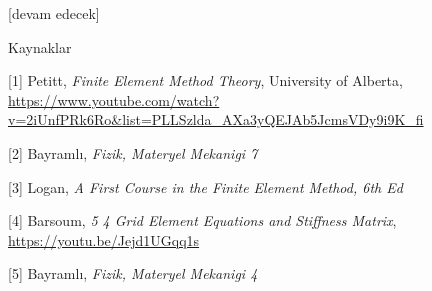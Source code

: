 \documentclass[12pt,fleqn]{article}\usepackage{../../common}
\begin{document}
[devam edecek]

Kaynaklar

[1] Petitt, {\em Finite Element Method Theory}, University of Alberta,
    \url{https://www.youtube.com/watch?v=2iUnfPRk6Ro&list=PLLSzlda_AXa3yQEJAb5JcmsVDy9i9K_fi}

[2] Bayramlı, {\em Fizik, Materyel Mekanigi 7}

[3] Logan, {\em A First Course in the Finite Element Method, 6th Ed}

[4] Barsoum, {\em 5 4 Grid Element Equations and Stiffness Matrix},
    \url{https://youtu.be/Jejd1UGqq1s}

[5] Bayramlı, {\em Fizik, Materyel Mekanigi 4}
\end{document}
